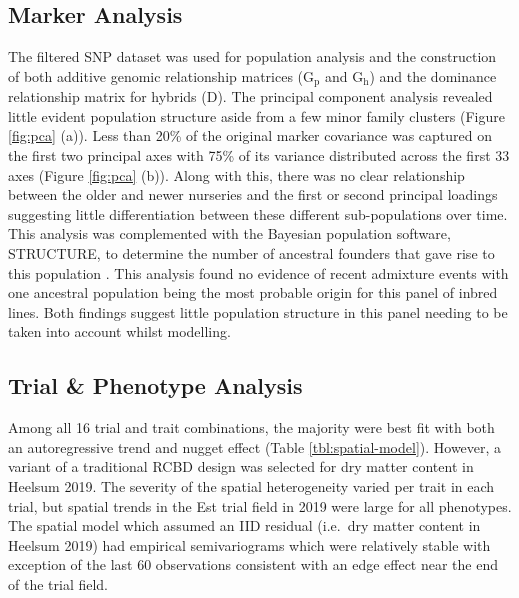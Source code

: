 \subsection{Marker Analysis}


The filtered SNP dataset was used for population analysis and the construction of both additive genomic relationship matrices (\(\mathrm{ G_p}\) and \(\mathrm{ G_h}\)) and the dominance relationship matrix for hybrids (\(\mathrm{D}\)). The principal component analysis revealed little evident population structure aside from a few minor family clusters (Figure \ref{fig:pca} (a)). Less than 20\% of the original marker covariance was captured on the first two principal axes with 75\% of its variance distributed across the first 33 axes (Figure \ref{fig:pca} (b)). Along with this, there was no clear relationship between the older and newer nurseries and the first or second principal loadings suggesting little differentiation between these different sub-populations over time. This analysis was complemented with the Bayesian population software, STRUCTURE, to determine the number of ancestral founders that gave rise to this population \cite{Falush2003}. This analysis found no evidence of recent admixture events with one ancestral population being the most probable origin for this panel of inbred lines. Both findings suggest little population structure in this panel needing to be taken into account whilst modelling.

\subsection{Trial \& Phenotype Analysis}

Among all 16 trial and trait combinations, the majority were best fit with both an autoregressive trend and nugget effect (Table \ref{tbl:spatial-model}). However, a variant of a traditional RCBD design was selected for dry matter content in Heelsum 2019. The severity of the spatial heterogeneity varied per trait in each trial, but spatial trends in the Est trial field in 2019 were large for all phenotypes. The spatial model which assumed an IID residual (i.e.~dry matter content in Heelsum 2019) had empirical semivariograms which were relatively stable with exception of the last 60 observations consistent with an edge effect near the end of the trial field.

